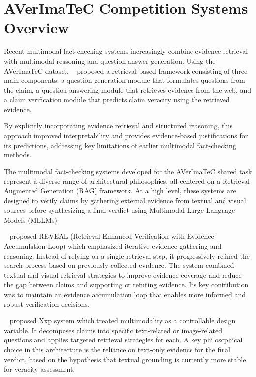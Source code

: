 \section{AVerImaTeC  Competition Systems Overview}

Recent multimodal fact-checking systems increasingly combine evidence retrieval with multimodal reasoning and question-answer generation. Using the AVerImaTeC  dataset, ~\citet{Cao2025May} proposed a retrieval-based framework consisting of three main components: a question generation module that formulates questions from the claim, a question answering module that retrieves evidence from the web, and a claim verification module that predicts claim veracity using the retrieved evidence.

By explicitly incorporating evidence retrieval and structured reasoning, this approach improved interpretability and provides evidence-based justifications for its predictions, addressing key limitations of earlier multimodal fact-checking methods.

The multimodal fact-checking systems developed for the AVerImaTeC shared task represent a diverse range of architectural philosophies, all centered on a Retrieval-Augmented Generation (RAG) framework. At a high level, these systems are designed to verify claims by gathering external evidence from textual and visual sources before synthesizing a final verdict using Multimodal Large Language Models (MLLMs)

~\citet{Tariq2026Mar} proposed REVEAL (Retrieval-Enhanced Verification with Evidence Accumulation Loop) which emphasized iterative evidence gathering and reasoning. Instead of relying on a single retrieval step, it progressively refined the search process based on previously collected evidence. The system combined textual and visual retrieval strategies to improve evidence coverage and reduce the gap between claims and supporting or refuting evidence. Its key contribution was to maintain an evidence accumulation loop that enables more informed and robust verification decisions.

~\citet{Tsoneva2026Mar} proposed Xxp system which treated multimodality as a controllable design variable. It decomposes claims into specific text-related or image-related questions and applies targeted retrieval strategies for each. A key philosophical choice in this architecture is the reliance on text-only evidence for the final verdict, based on the hypothesis that textual grounding is currently more stable for veracity assessment.

